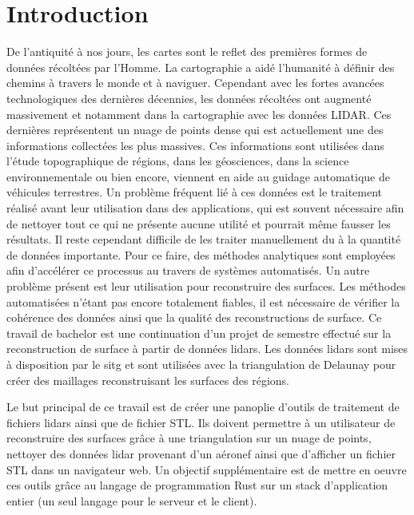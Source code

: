 \chapter{Introduction}
De l'antiquité à nos jours, les cartes sont le reflet des premières formes de données récoltées par l'Homme.
La cartographie a aidé l'humanité à définir des chemins à travers le monde et à naviguer.
Cependant avec les fortes avancées technologiques des dernières décennies,
les données récoltées ont augmenté massivement et notamment dans la cartographie avec les données LIDAR.
Ces dernières représentent un nuage de points dense qui est actuellement une des informations collectées les plus massives.
Ces informations sont utilisées dans l'étude topographique de régions, dans les géosciences,
dans la science environnementale ou bien encore, viennent en aide au guidage automatique de véhicules terrestres.
Un problème fréquent lié à ces données est le traitement réalisé avant leur
utilisation dans des applications, qui est souvent nécessaire afin de nettoyer
tout ce qui ne présente aucune utilité et pourrait même fausser les résultats.
Il reste cependant difficile de les traiter manuellement du à la quantité de données importante.
Pour ce faire, des méthodes analytiques sont employées afin d'accélérer ce processus au travers de systèmes automatisés.
Un autre problème présent est leur utilisation pour reconstruire des surfaces.
Les méthodes automatisées n'étant pas encore totalement fiables, il est nécessaire de
vérifier la cohérence des données ainsi que la qualité des reconstructions de
surface. Ce travail de bachelor est une continuation d'un projet de semestre effectué sur
la reconstruction de surface à partir de données lidars.
Les données lidars sont mises à disposition par le \gls{sitg} et sont utilisées
avec la triangulation de Delaunay pour créer des maillages reconstruisant les
surfaces des régions.

Le but principal de ce travail est de créer une panoplie d'outils de traitement
de fichiers lidars ainsi que de fichier STL. Ils doivent permettre à un
utilisateur de reconstruire des surfaces grâce à une triangulation sur un nuage
de points, nettoyer des données lidar provenant d'un aéronef ainsi que
d'afficher un fichier STL dans un navigateur web. Un objectif supplémentaire est
de mettre en oeuvre ces outils grâce au langage de programmation Rust sur un
stack d'application entier (un seul langage pour le serveur et le client).

